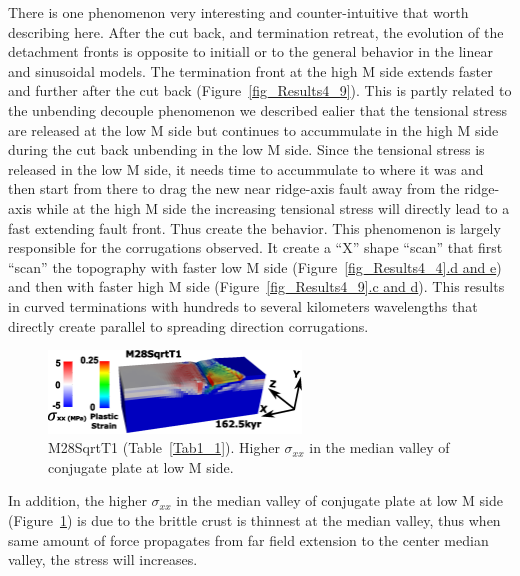There is one phenomenon very interesting and counter-intuitive that worth describing here. After the cut back, and termination retreat, the evolution of the detachment fronts is opposite to initiall or to the general behavior in the linear and sinusoidal models. The termination front at the high M side extends faster and further after the cut back (Figure~\hyperref[fig_Results4_9]{\ref{fig_Results4_9}}). This is partly related to the unbending decouple phenomenon we described ealier that the tensional stress are released at the low M side but continues to accummulate in the high M side during the cut back unbending in the low M side. Since the tensional stress is released in the low M side, it needs time to accummulate to where it was and then start from there to drag the new near ridge-axis fault away from the ridge-axis while at the high M side the increasing tensional stress will directly lead to a fast extending fault front. Thus create the behavior.  This phenomenon is largely responsible for the corrugations observed. It create a ``X'' shape ``scan'' that first ``scan'' the topography with faster low M side (Figure~\hyperref[fig_Results4_4]{\ref{fig_Results4_4}.d and e}) and then with faster high M side (Figure~\hyperref[fig_Results4_9]{\ref{fig_Results4_9}.c and d}). This results in curved terminations with hundreds to several kilometers wavelengths that directly create parallel to spreading direction corrugations.    

\begin{figure}[h]
  \centering
    \includegraphics[width=0.6\textwidth]{./Figures/fig_Results4_7_sqrt_cut_back_conjugate_Sxx.eps}
  \caption{M28SqrtT1 (Table~\hyperref[Tab1_1]{\ref{Tab1_1}}). Higher $\sigma_{xx}$ in the median valley of conjugate plate at low M side. }
 \label{fig_Results4_7}
\end{figure}

In addition, the higher $\sigma_{xx}$ in the median valley of conjugate plate at low M side (Figure~\hyperref[fig_Results4_7]{\ref{fig_Results4_7}}) is due to the brittle crust is thinnest at the median valley, thus when same amount of force propagates from far field extension to the center median valley, the stress will increases.    
\fi



